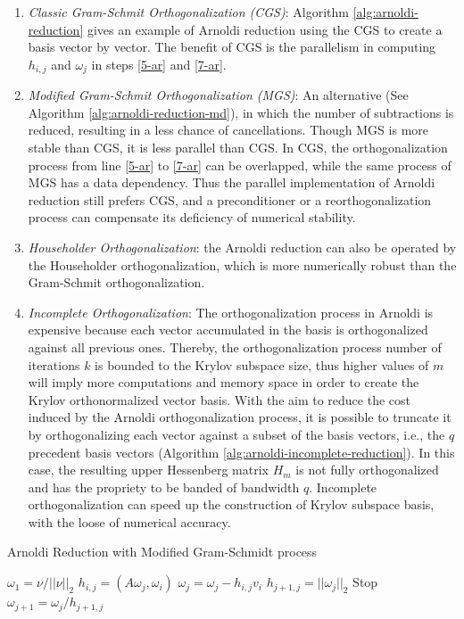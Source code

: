\begin{enumerate}
	\item \textit{Classic Gram-Schmit Orthogonalization (CGS)}: Algorithm \ref{alg:arnoldi-reduction} gives an example of Arnoldi reduction using the CGS to create a basis vector by vector. The benefit of CGS is the parallelism in computing $h_{i,j}$ and $\omega_j$ in steps \ref{5-ar} and \ref{7-ar}.
	\item \textit{Modified Gram-Schmit Orthogonalization (MGS)}: An alternative (See Algorithm \ref{alg:arnoldi-reduction-md}), in which the number of subtractions is reduced, resulting in a less chance of cancellations. Though MGS is more stable than CGS, it is less parallel than CGS. In CGS, the orthogonalization process from line \ref{5-ar} to \ref{7-ar} can be overlapped, while the same process of MGS has a data dependency. Thus the parallel implementation of Arnoldi reduction still prefers CGS, and a preconditioner or a reorthogonalization process can compensate its deficiency of numerical stability.
	\item \textit{Householder Orthogonalization}: the  Arnoldi reduction can also be operated by the Householder orthogonalization, which is more numerically robust than the Gram-Schmit orthogonalization.
	\item \textit{Incomplete Orthogonalization}: The orthogonalization process in Arnoldi is expensive because each vector accumulated in the basis is orthogonalized against all previous ones. Thereby, the orthogonalization process number of iterations $k$ is bounded to the Krylov subspace size, thus higher values of $m$ will imply more computations and memory space in order to create the Krylov orthonormalized vector basis. With the aim to reduce the cost induced by the Arnoldi orthogonalization process, it is possible to truncate it by orthogonalizing each vector against a subset of the basis vectors, i.e., the $q$ precedent basis vectors (Algorithm \ref{alg:arnoldi-incomplete-reduction}). In this case, the resulting upper Hessenberg matrix $H_m$ is not fully orthogonalized and has the propriety to be banded of bandwidth $q$. Incomplete orthogonalization can speed up the construction of Krylov subspace basis, with the loose of numerical accuracy.
\end{enumerate}

\begin{algorithm}[t]{}
	\caption{Arnoldi Reduction with Modified Gram-Schmidt process}   
	\label{alg:arnoldi-reduction-md}   
	\begin{algorithmic}[1]
		\State $\omega_1=\nu /||\nu||_2$
		\State $h_{i,j}=(A\omega_j,\omega_i)$
		\State $\omega_j=\omega_j-h_{i,j}v_i$
		\EndFor
		\State $h_{j+1,j}=||\omega_j||_2$
		 Stop
		\EndIf
		\State $\omega_{j+1}=\omega_j/h_{j+1,j}$
		\EndFor 
		\EndFunction
	\end{algorithmic}  
\end{algorithm}

